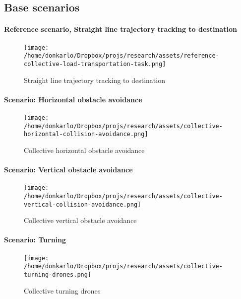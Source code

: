 \documentclass{article}
\begin{document}
		\subsection{Base scenarios}
			\paragraph{Reference scenario, Straight line trajectory tracking to destination} 
				\begin{figure*}
					\centering
					\texttt{[image: /home/donkarlo/Dropbox/projs/research/assets/reference-collective-load-transportation-task.png]}
					\caption{Straight line trajectory tracking to destination}
					\label{fig:reference-collective-load-transportation-task}
				\end{figure*}
			
			\paragraph{Scenario: Horizontal obstacle avoidance}
				\begin{figure*}
					\centering
					\texttt{[image: /home/donkarlo/Dropbox/projs/research/assets/collective-horizontal-collision-avoidance.png]}
					\caption{Collective horizontal obstacle avoidance}
					\label{fig:swarm-drones-reference-task}
				\end{figure*}
			
			\paragraph{Scenario: Vertical obstacle avoidance}
				\begin{figure*}
					\centering
					\texttt{[image: /home/donkarlo/Dropbox/projs/research/assets/collective-vertical-collision-avoidance.png]}
					\caption{Collective vertical obstacle avoidance}
					\label{fig:collective-vertical-collision-avoidance}
				\end{figure*}
			
			\paragraph{Scenario: Turning}
				\begin{figure*}
					\centering
					\texttt{[image: /home/donkarlo/Dropbox/projs/research/assets/collective-turning-drones.png]}
					\caption{Collective turning drones}
					\label{fig:collective-turning-drones}
				\end{figure*}
			
\end{document}
